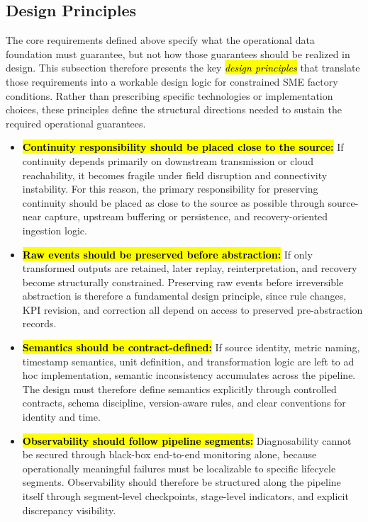 \documentclass[systems,article,accept,pdftex,moreauthors]{Definitions/mdpi}
\begin{document}
\subsection{Design Principles}
\label{sec:design_principles}

The core requirements defined above specify what the operational data foundation must guarantee, but not how those guarantees should be realized in design. This subsection therefore presents the key \emph{\hl{design principles}} that translate those requirements into a workable design logic for constrained SME factory conditions. Rather than prescribing specific technologies or implementation choices, these principles define the structural directions needed to sustain the required operational guarantees.

\begin{itemize}
    \item[\textbf{\hl{P1.}}] \textbf{\hl{Continuity responsibility should be placed close to the source:}} If continuity depends primarily on downstream transmission or cloud reachability, it becomes fragile under field disruption and connectivity instability. For this reason, the primary responsibility for preserving continuity should be placed as close to the source as possible through source-near capture, upstream buffering or persistence, and recovery-oriented ingestion logic.

    \item[\textbf{\hl{P2.}}] \textbf{\hl{Raw events should be preserved before abstraction:}} If only transformed outputs are retained, later replay, reinterpretation, and recovery become structurally constrained. Preserving raw events before irreversible abstraction is therefore a fundamental design principle, since rule changes, KPI revision, and correction all depend on access to preserved pre-abstraction records.

    \item[\textbf{\hl{P3.}}] \textbf{\hl{Semantics should be contract-defined:}} If source identity, metric naming, timestamp semantics, unit definition, and transformation logic are left to ad hoc implementation, semantic inconsistency accumulates across the pipeline. The design must therefore define semantics explicitly through controlled contracts, schema discipline, version-aware rules, and clear conventions for identity and time.

    \item[\textbf{\hl{P4.}}] \textbf{\hl{Observability should follow pipeline segments:}} Diagnosability cannot be secured through black-box end-to-end monitoring alone, because operationally meaningful failures must be localizable to specific lifecycle segments. Observability should therefore be structured along the pipeline itself through segment-level checkpoints, stage-level indicators, and explicit discrepancy visibility.


\end{itemize}
\end{document}
